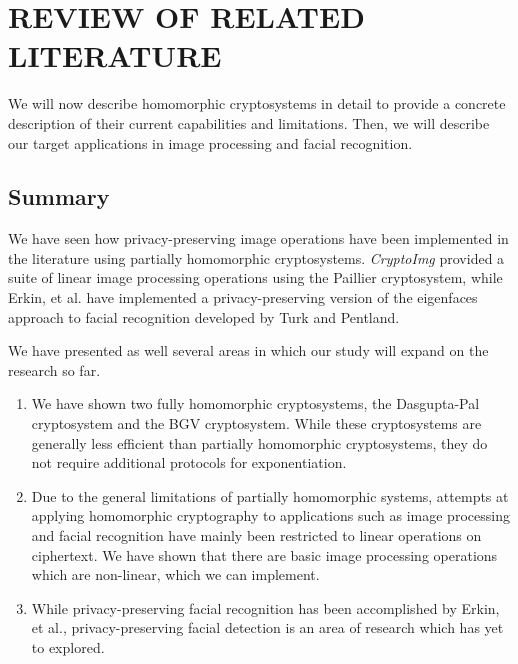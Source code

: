 \chapter{REVIEW OF RELATED LITERATURE}

We will now describe homomorphic cryptosystems in detail to provide a concrete description of their current capabilities and limitations. Then, we will describe our target applications in image processing and facial recognition.









\section{Summary}
We have seen how privacy-preserving image operations have been implemented in the literature using partially homomorphic cryptosystems. \textit{CryptoImg} provided a suite of linear image processing operations using the Paillier cryptosystem, while Erkin, et al. have implemented a privacy-preserving version of the eigenfaces approach to facial recognition developed by Turk and Pentland.

We have presented as well several areas in which our study will expand on the research so far.
\begin{enumerate}
  \item We have shown two fully homomorphic cryptosystems, the Dasgupta-Pal cryptosystem and the BGV cryptosystem. While these cryptosystems are generally less efficient than partially homomorphic cryptosystems, they do not require additional protocols for exponentiation.
  \item Due to the general limitations of partially homomorphic systems, attempts at applying homomorphic cryptography to applications such as image processing and facial recognition have mainly been restricted to linear operations on ciphertext. We have shown that there are basic image processing operations which are non-linear, which we can implement.
  \item While privacy-preserving facial recognition has been accomplished by Erkin, et al., privacy-preserving facial detection is an area of research which has yet to explored.
\end{enumerate}
